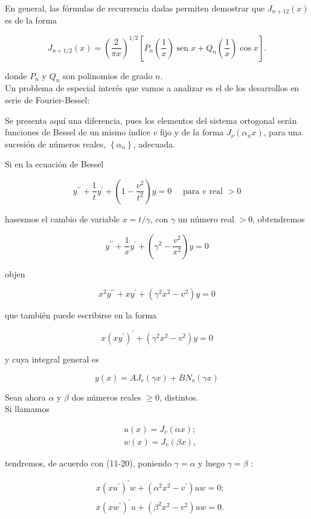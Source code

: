 \documentclass[10pt]{article}
\theoremstyle{plain}
\theoremstyle{definition}
\theoremstyle{remark}
\begin{document}
En general, las fórmulas de recurrencia dadas permiten demostrar que $J_{n+12}(x)$ es de la forma

$$
J_{n+1 / 2}(x)=\left(\frac{2}{\pi x}\right)^{1 / 2}\left[P_{n}\left(\frac{1}{x}\right) \operatorname{sen} x+Q_{n}\left(\frac{1}{x}\right) \cos x\right] .
$$

donde $P_{n}$ y $Q_{n}$ son polinomios de grado $n$.\\
Un problema de especial interés que vamos a analizar es el de los desarrollos en serie de Fourier-Bessel:

Se presenta aquí una diferencia, pues los elementos del sistema ortogonal serán funciones de Bessel de un mismo índice $v$ fijo y de la forma $J_{\nu}\left(\alpha_{n} x\right)$, para una sucesión de números reales, $\left\{\alpha_{n}\right\}$, adecuada.

Si en la ecuación de Bessel

$$
y^{\prime \prime}+\frac{1}{t} y^{\prime}+\left(1-\frac{\nu^{2}}{t^{2}}\right) y=0 \quad \text { para } v \text { real }>0
$$

hasesmos el cambio de variable $x=t / \gamma$, con $\gamma$ un número real $>0$, obtendremos

$$
y^{\prime \prime}+\frac{1}{x} y^{\prime}+\left(\gamma^{2}-\frac{v^{2}}{x^{2}}\right) y=0
$$

objen

$$
x^{2} y^{\prime \prime}+x y^{\prime}+\left(\gamma^{2} x^{2}-v^{2}\right) y=0
$$

que también puede escribirse en la forma

$$
x\left(x y^{\prime}\right)^{\prime}+\left(\gamma^{2} x^{2}-v^{2}\right) y=0
$$

y cuya integral general es

$$
y(x)=A J_{v}(\gamma x)+B N_{v}(\gamma x)
$$

Sean ahora $\alpha$ y $\beta$ dos números reales $\geqslant 0$, distintos.\\
Si llamamos

$$
\begin{aligned}
& u(x)=J_{v}(\alpha x) ; \\
& w(x)=J_{v}(\beta x),
\end{aligned}
$$

tendremos, de acuerdo con (11-20), poniendo $\gamma=\alpha$ y luego $\gamma=\beta$ :


\begin{align*}
& x\left(x u^{\prime}\right)^{\prime} w+\left(\alpha^{2} x^{2}-v^{\prime}\right) u w=0 ;  \tag{11-21}\\
& x\left(x w^{\prime}\right)^{\prime} u+\left(\beta^{2} x^{2}-v^{2}\right) u w=0 .
\end{align*}
\end{document}
